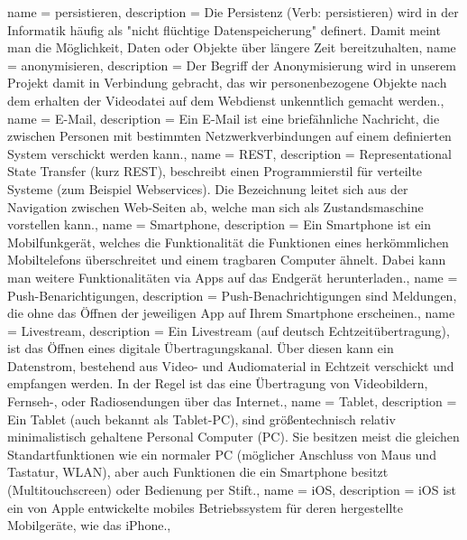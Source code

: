 {
  name = persistieren,
  description = {Die Persistenz (Verb: persistieren) wird in der Informatik häufig als "nicht flüchtige Datenspeicherung" definert. Damit meint man die Möglichkeit, Daten oder Objekte über längere Zeit bereitzuhalten},
}
{
  name = anonymisieren,
  description = {Der Begriff der Anonymisierung wird in unserem Projekt damit in Verbindung gebracht, das wir personenbezogene Objekte nach dem erhalten der Videodatei auf dem \gls{Webdienst} unkenntlich gemacht werden.},
}
{
  name = E-Mail,
  description = {Ein E-Mail ist eine briefähnliche Nachricht, die zwischen Personen mit bestimmten Netzwerkverbindungen auf einem definierten System verschickt werden kann.},
}
{
  name = REST,
  description = {Representational State Transfer (kurz REST), beschreibt einen Programmierstil für verteilte Systeme (zum Beispiel Webservices). Die Bezeichnung leitet sich aus der Navigation zwischen Web-Seiten ab, welche man sich als Zustandsmaschine vorstellen kann.},
}
{
  name = Smartphone,
  description = {Ein Smartphone ist ein Mobilfunkgerät, welches die Funktionalität die Funktionen eines herkömmlichen Mobiltelefons überschreitet und einem tragbaren Computer ähnelt. Dabei kann man weitere Funktionalitäten via \glspl{App} auf das Endgerät herunterladen.},
}
{
  name = Push-Benarichtigungen,
  description = {Push-Benachrichtigungen sind Meldungen, die ohne das Öffnen der jeweiligen \gls{App} auf Ihrem \gls{Smartphone} erscheinen.},
}
{
  name = Livestream,
  description = {Ein Livestream (auf deutsch Echtzeitübertragung), ist das Öffnen eines digitale Übertragungskanal. Über diesen kann ein Datenstrom, bestehend aus Video- und Audiomaterial in Echtzeit verschickt und empfangen werden. In der Regel ist das eine Übertragung von Videobildern, Fernseh-, oder Radiosendungen über das Internet.},
}
{
  name = Tablet,
  description = {Ein Tablet (auch bekannt als Tablet-PC), sind größentechnisch relativ minimalistisch gehaltene Personal Computer (PC). Sie besitzen meist die gleichen Standartfunktionen wie ein normaler PC (möglicher Anschluss von Maus und Tastatur, WLAN), aber auch Funktionen die ein \gls{Smartphone} besitzt (Multitouchscreen) oder Bedienung per Stift.},
}
{
  name = iOS,
  description = {iOS ist ein von Apple entwickelte mobiles Betriebssystem für deren hergestellte Mobilgeräte, wie das iPhone.},
}
